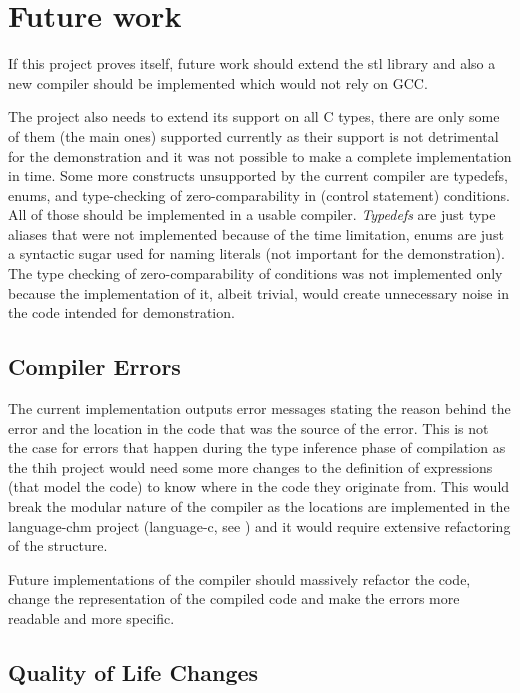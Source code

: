 \section{Future work}

If this project proves itself, future work should extend the stl library and also a new compiler should be implemented which would not rely on GCC.

The project also needs to extend its support on all C types, there are only some of them (the main ones) supported currently as their support is not detrimental for the demonstration and it was not possible to make a complete implementation in time. Some more constructs unsupported by the current compiler are typedefs, enums, and type-checking of zero-comparability in (control statement) conditions. All of those should be implemented in a usable compiler. \emph{Typedefs} are just type aliases that were not implemented because of the time limitation, enums are just a syntactic sugar used for naming literals (not important for the demonstration). The type checking of zero-comparability of conditions was not implemented only because the implementation of it, albeit trivial, would create unnecessary noise in the code intended for demonstration.

\subsection{Compiler Errors}

The current implementation outputs error messages stating the reason behind the error and the location in the code that was the source of the error. This is not the case for errors that happen during the type inference phase of compilation as the thih \cite{jones1999typing} project would need some more changes to the definition of expressions (that model the code) to know where in the code they originate from. This would break the modular nature of the compiler as the locations are implemented in the language-chm project (language-c, see \cite{visq2018language-c}) and it would require extensive refactoring of the structure.

Future implementations of the compiler should massively refactor the code, change the representation of the compiled code and make the errors more readable and more specific.

\subsection{Quality of Life Changes}

